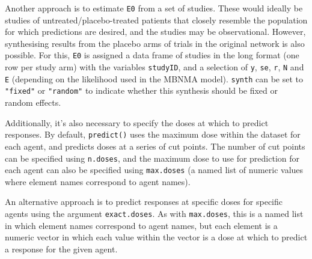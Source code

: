 \documentclass[]{article}
\newenvironment{Shaded}{\begin{snugshade}}{\end{snugshade}}
\newcommand{\DecValTok}[1]{\textcolor[rgb]{0.00,0.00,0.81}{#1}}
\newcommand{\NormalTok}[1]{#1}
\newcommand{\OperatorTok}[1]{\textcolor[rgb]{0.81,0.36,0.00}{\textbf{#1}}}
\newcommand{\StringTok}[1]{\textcolor[rgb]{0.31,0.60,0.02}{#1}}
\begin{document}
Another approach is to estimate \texttt{E0} from a set of studies. These
would ideally be studies of untreated/placebo-treated patients that
closely resemble the population for which predictions are desired, and
the studies may be observational. However, synthesising results from the
placebo arms of trials in the original network is also possible. For
this, \texttt{E0} is assigned a data frame of studies in the long format
(one row per study arm) with the variables \texttt{studyID}, and a
selection of \texttt{y}, \texttt{se}, \texttt{r}, \texttt{N} and
\texttt{E} (depending on the likelihood used in the MBNMA model).
\texttt{synth} can be set to \texttt{"fixed"} or \texttt{"random"} to
indicate whether this synthesis should be fixed or random effects.

\begin{Shaded}
\end{Shaded}

Additionally, it's also necessary to specify the doses at which to
predict responses. By default, \texttt{predict()} uses the maximum dose
within the dataset for each agent, and predicts doses at a series of cut
points. The number of cut points can be specified using
\texttt{n.doses}, and the maximum dose to use for prediction for each
agent can also be specified using \texttt{max.doses} (a named list of
numeric values where element names correspond to agent names).

An alternative approach is to predict responses at specific doses for
specific agents using the argument \texttt{exact.doses}. As with
\texttt{max.doses}, this is a named list in which element names
correspond to agent names, but each element is a numeric vector in which
each value within the vector is a dose at which to predict a response
for the given agent.
\end{document}
